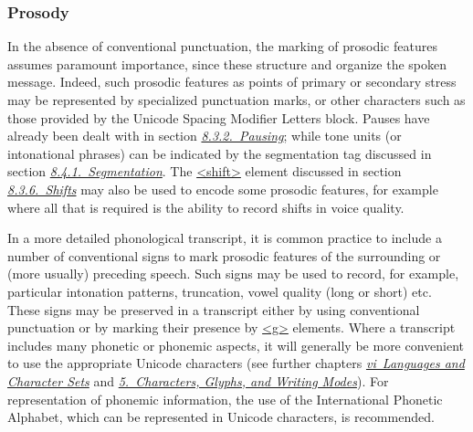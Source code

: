 \subsubsection[{Prosody}]{Prosody}\label{TSTPPR}\par
In the absence of conventional punctuation, the marking of prosodic features assumes paramount importance, since these structure and organize the spoken message. Indeed, such prosodic features as points of primary or secondary stress may be represented by specialized punctuation marks, or other characters such as those provided by the Unicode Spacing Modifier Letters block. Pauses have already been dealt with in section \textit{\hyperref[TSBAPA]{8.3.2.\ Pausing}}; while tone units (or intonational phrases) can be indicated by the segmentation tag discussed in section \textit{\hyperref[TSSASE]{8.4.1.\ Segmentation}}. The \hyperref[TEI.shift]{<shift>} element discussed in section \textit{\hyperref[TSSASH]{8.3.6.\ Shifts}} may also be used to encode some prosodic features, for example where all that is required is the ability to record shifts in voice quality.\par
In a more detailed phonological transcript, it is common practice to include a number of conventional signs to mark prosodic features of the surrounding or (more usually) preceding speech. Such signs may be used to record, for example, particular intonation patterns, truncation, vowel quality (long or short) etc. These signs may be preserved in a transcript either by using conventional punctuation or by marking their presence by \hyperref[TEI.g]{<g>} elements. Where a transcript includes many phonetic or phonemic aspects, it will generally be more convenient to use the appropriate Unicode characters (see further chapters \textit{\hyperref[CH]{vi\ Languages and Character Sets}} and \textit{\hyperref[WD]{5.\ Characters, Glyphs, and Writing Modes}}). For representation of phonemic information, the use of the International Phonetic Alphabet, which can be represented in Unicode characters, is recommended.\par
